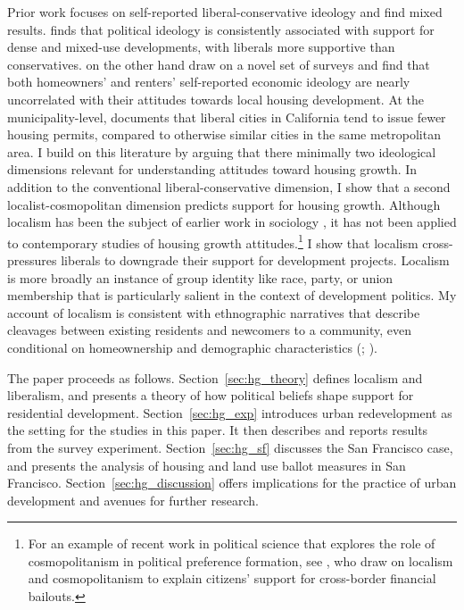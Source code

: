 \documentclass[article,12pt]{memoir}
\begin{document}
Prior work focuses on self-reported liberal-conservative ideology and find mixed results. \citet{lewis_complexity_2010} finds that political ideology is consistently associated with support for dense and mixed-use developments, with liberals more supportive than conservatives. \citet{marble_where_2018} on the other hand draw on a novel set of surveys and find that both homeowners' and renters' self-reported economic ideology are nearly uncorrelated with their attitudes towards local housing development. At the municipality-level, \citet{kahn_liberal_2011} documents that liberal cities in California tend to issue fewer housing permits, compared to otherwise similar cities in the same metropolitan area. I build on this literature by arguing that there minimally two ideological dimensions relevant for understanding attitudes toward housing growth. In addition to the conventional liberal-conservative dimension, I show that a second localist-cosmopolitan dimension predicts support for housing growth.  Although localism has been the subject of earlier work in sociology \citep[e.g.][]{zimmerman_centralism_1938,dye_local-cosmopolitan_1963-1,merton_social_1968}, it has not been applied to contemporary studies of housing growth attitudes.\footnote{For an example of recent work in political science that explores the role of cosmopolitanism in political preference formation, see \citet{bechtel_preferences_2014}, who draw on localism and cosmopolitanism to explain citizens' support for cross-border financial bailouts.} I show that localism cross-pressures liberals to downgrade their support for development projects. Localism is more broadly an instance of group identity like race, party, or union membership \citep{fowler_beyond_2007,huddy_group_2013} that is particularly salient in the context of development politics. My account of localism is consistent with ethnographic narratives that describe cleavages between existing residents and newcomers to a community, even conditional on homeownership and demographic characteristics (\citealp[chap. 8]{kohn_death_2016}; \citealp{pattillo_black_2008}).

The paper proceeds as follows. Section~\ref{sec:hg_theory} defines localism and liberalism, and presents a theory of how political beliefs shape support for residential development. Section~\ref{sec:hg_exp} introduces urban redevelopment as the setting for the studies in this paper. It then describes and reports results from the survey experiment. Section~\ref{sec:hg_sf} discusses the San Francisco case, and presents the analysis of housing and land use ballot measures in San Francisco. Section~\ref{sec:hg_discussion} offers implications for the practice of urban development and avenues for further research.
\end{document}
